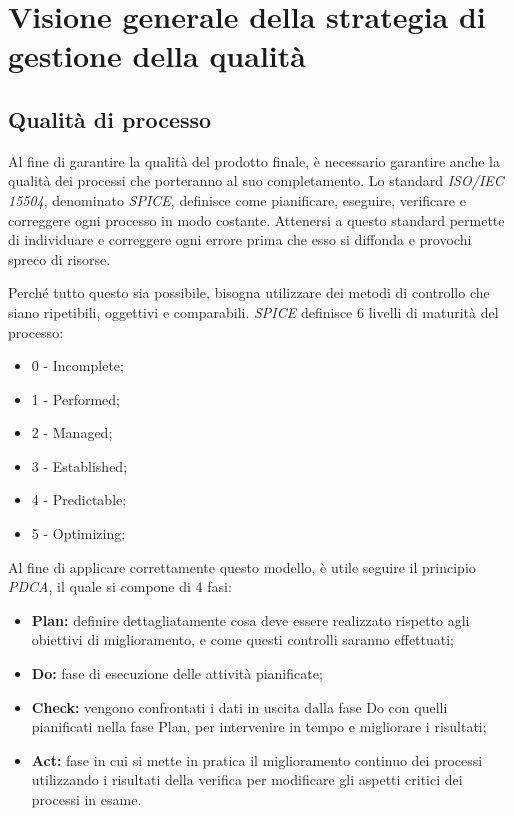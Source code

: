 \newpage
\section{Visione generale della strategia di gestione della qualità}

	\subsection{Qualità di processo}
	Al fine di garantire la qualità del prodotto finale, è necessario garantire anche la qualità dei processi che porteranno al suo completamento. Lo standard \textit{ISO/IEC 15504}, denominato \textit{SPICE}, definisce come pianificare, eseguire, verificare e correggere ogni processo in modo costante. 
	Attenersi a questo standard permette di individuare e correggere ogni errore prima che esso si diffonda e provochi spreco di risorse. 
	
	Perché tutto questo sia possibile, bisogna utilizzare dei metodi di controllo che siano ripetibili, oggettivi e comparabili. \textit{SPICE} definisce 6 livelli di maturità del processo:
	
	\begin{itemize}
		\item 0 - Incomplete;
		\item 1 - Performed;
		\item 2 - Managed;
		\item 3 - Established;
		\item 4 - Predictable;
		\item 5 - Optimizing;
	\end{itemize}
	
	Al fine di applicare correttamente questo modello, è utile seguire il principio \textit{PDCA}, il quale si compone di 4 fasi:
	
	\begin{itemize}
		\item \textbf{Plan: }definire dettagliatamente cosa deve essere realizzato rispetto agli obiettivi di miglioramento, e come questi controlli saranno effettuati;
		\item \textbf{Do: }fase di esecuzione delle attività pianificate;
		\item \textbf{Check: }vengono confrontati i dati in uscita dalla fase Do con quelli pianificati nella fase Plan, per intervenire in tempo e migliorare i risultati;
		\item \textbf{Act: }fase in cui si mette in pratica il miglioramento continuo dei processi utilizzando i risultati della verifica per modificare gli aspetti critici dei processi in esame.
	\end{itemize}


